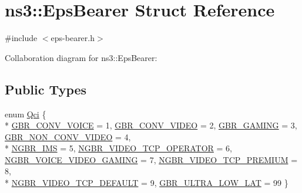 \hypertarget{structns3_1_1EpsBearer}{}\section{ns3\+:\+:Eps\+Bearer Struct Reference}
\label{structns3_1_1EpsBearer}


{\ttfamily \#include $<$eps-\/bearer.\+h$>$}



Collaboration diagram for ns3\+:\+:Eps\+Bearer\+:
\subsection*{Public Types}
\begin{DoxyCompactItemize}
\item 
enum \hyperlink{structns3_1_1EpsBearer_aecf0c67109c5eb4ec0b07226fff5885e}{Qci} \{ \\*
\hyperlink{structns3_1_1EpsBearer_aecf0c67109c5eb4ec0b07226fff5885ea02ebd970315c3f749f5abac6e0c3e6d7}{G\+B\+R\+\_\+\+C\+O\+N\+V\+\_\+\+V\+O\+I\+CE} = 1, 
\hyperlink{structns3_1_1EpsBearer_aecf0c67109c5eb4ec0b07226fff5885ea82e84fa0f23127c46b7cca9d1c20346a}{G\+B\+R\+\_\+\+C\+O\+N\+V\+\_\+\+V\+I\+D\+EO} = 2, 
\hyperlink{structns3_1_1EpsBearer_aecf0c67109c5eb4ec0b07226fff5885ea4fa960919034c87227bc718743f9e134}{G\+B\+R\+\_\+\+G\+A\+M\+I\+NG} = 3, 
\hyperlink{structns3_1_1EpsBearer_aecf0c67109c5eb4ec0b07226fff5885ea34c3db7ae36ed183268fa584832076fa}{G\+B\+R\+\_\+\+N\+O\+N\+\_\+\+C\+O\+N\+V\+\_\+\+V\+I\+D\+EO} = 4, 
\\*
\hyperlink{structns3_1_1EpsBearer_aecf0c67109c5eb4ec0b07226fff5885ead42ffe98d2f61b9e4ec6a20a21b04637}{N\+G\+B\+R\+\_\+\+I\+MS} = 5, 
\hyperlink{structns3_1_1EpsBearer_aecf0c67109c5eb4ec0b07226fff5885eabba7f1a76e6fb4b3de9e649edc2c9fee}{N\+G\+B\+R\+\_\+\+V\+I\+D\+E\+O\+\_\+\+T\+C\+P\+\_\+\+O\+P\+E\+R\+A\+T\+OR} = 6, 
\hyperlink{structns3_1_1EpsBearer_aecf0c67109c5eb4ec0b07226fff5885ea9ea9e71ca15fa1263fde68f178940e8a}{N\+G\+B\+R\+\_\+\+V\+O\+I\+C\+E\+\_\+\+V\+I\+D\+E\+O\+\_\+\+G\+A\+M\+I\+NG} = 7, 
\hyperlink{structns3_1_1EpsBearer_aecf0c67109c5eb4ec0b07226fff5885ead5429f10026856895f808196cbb84105}{N\+G\+B\+R\+\_\+\+V\+I\+D\+E\+O\+\_\+\+T\+C\+P\+\_\+\+P\+R\+E\+M\+I\+UM} = 8, 
\\*
\hyperlink{structns3_1_1EpsBearer_aecf0c67109c5eb4ec0b07226fff5885ea0e7232f1a6148d754be3a3d9e425d452}{N\+G\+B\+R\+\_\+\+V\+I\+D\+E\+O\+\_\+\+T\+C\+P\+\_\+\+D\+E\+F\+A\+U\+LT} = 9, 
\hyperlink{structns3_1_1EpsBearer_aecf0c67109c5eb4ec0b07226fff5885ea1b3267491c7ea82ddc90b433c429c7c1}{G\+B\+R\+\_\+\+U\+L\+T\+R\+A\+\_\+\+L\+O\+W\+\_\+\+L\+AT} = 99
 \}
\end{DoxyCompactItemize}
